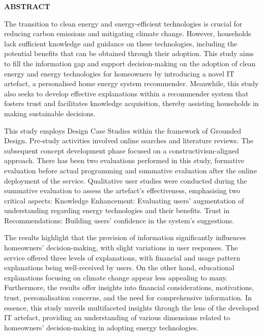  \setcounter{page}{3}
\begin{center}
{\Large{\bf{ABSTRACT}}}
\end{center}

\noindent
The transition to clean energy and energy-efficient technologies is crucial for reducing carbon emissions and mitigating climate change. 
However, households lack sufficient knowledge and guidance on these technologies, including the potential benefits that can be obtained through their adoption.
This study aims to fill the information gap and support decision-making on the adoption of clean energy and energy technologies for homeowners by introducing a novel IT artefact, a personalised home energy system recommender.
Meanwhile, this study also seeks to develop effective explanations within a recommender system that fosters trust and facilitates knowledge acquisition, thereby assisting households in making sustainable decisions.

This study employs Design Case Studies within the framework of Grounded Design. 
Pre-study activities involved online searches and literature reviews.
The subsequent concept development phase focused on a constructivism-aligned approach. 
There has been two evaluations performed in this study, formative evaluation before actual programming and summative evaluation after the online deployment of the service.
Qualitative user studies were conducted during the summative evaluation to assess the artefact's effectiveness, emphasising two critical aspects: 
Knowledge Enhancement: Evaluating users' augmentation of understanding regarding energy technologies and their benefits.
Trust in Recommendations: Building users' confidence in the system's suggestions.

The results highlight that the provision of information significantly influences homeowners' decision-making, with slight variations in user responses. 
The service offered three levels of explanations, with financial and usage pattern explanations being well-received by users. 
On the other hand, educational explanations focusing on climate change appear less appealing to many.
Furthermore, the results offer insights into financial considerations, motivations, trust, personalisation concerns, and the need for comprehensive information. 
In essence, this study unveils multifaceted insights through the lens of the developed IT artefact, providing an understanding of various dimensions related to homeowners' decision-making in adopting energy technologies.



